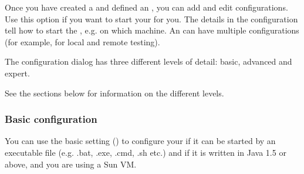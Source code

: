 


Once you have created a \gdproject{}  and defined an \gdaut{} , you can add and edit \gdaut{} configurations. Use this option if you want \jb{} to start your \gdaut{} for you. 
The details in the \gdaut{} configuration tell \jb{} how to start the \gdaut{}, e.g. on which machine. 
An \gdaut{} can have multiple configurations (for example, for local and remote testing).  


The \gdaut{} configuration dialog has three different levels of detail: basic, advanced and expert. 

See the sections below for information on the different levels. 

\subsubsection{Basic \gdaut{} configuration}

You can use the basic setting () to configure your \gdaut{} if it can be started by an executable file (e.g. .bat, .exe, .cmd, .sh etc.) and if it is written in Java 1.5 or above, and you are using a Sun VM. 

